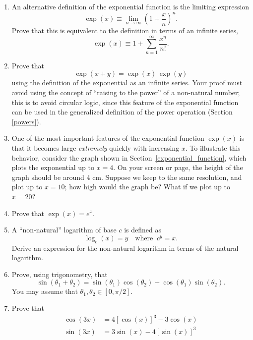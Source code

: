 \documentclass[10pt,a4paper]{article}
\begin{document}
\begin{enumerate}
  \def\labelenumi{\arabic{enumi}.}
\item
  An alternative definition of the exponential function is the limiting
  expression
  \begin{equation}
    \exp(x) \equiv \lim_{n\rightarrow\infty} \left(1+\frac{x}{n}\right)^n.
  \end{equation}
  Prove that this is equivalent to the definition in terms of an
  infinite series,
  \begin{equation}
    \exp(x) \equiv 1 + \sum_{n=1}^\infty\frac{x^n}{n!}.
  \end{equation}

\item
  Prove that
  \begin{equation}
    \exp(x+y) = \exp(x)\,\exp(y)
  \end{equation}
  using the definition of the exponential as an infinite series. Your
  proof must avoid using the concept of ``raising to the power'' of a
  non-natural number; this is to avoid circular logic, since this
  feature of the exponential function can be used in the generalized
  definition of the power operation (Section \ref{powers}).

\item
  One of the most important features of the exponential function
  $\exp(x)$ is that it becomes large \emph{extremely} quickly with
  increasing $x$. To illustrate this behavior, consider the graph
  shown in Section~\ref{exponential_function}, which plots the
  exponential up to $x = 4$.  On your screen or page, the height of
  the graph should be around 4 cm. Suppose we keep to the same
  resolution, and plot up to $x = 10$; how high would the graph be?
  What if we plot up to $x = 20$?

\item
  Prove that $\displaystyle \exp(x) = e^x.$

\item
  A ``non-natural'' logarithm of base $c$ is defined as
  \begin{equation}
    \log_c(x) = y \quad\mathrm{where}\;\; c^y = x.
  \end{equation}
  Derive an expression for the non-natural logarithm in terms of the
  natural logarithm.

\item
  Prove, using trigonometry, that
  \begin{equation}
    \sin(\theta_1 + \theta_2) = \sin(\theta_1) \cos(\theta_2) + \cos(\theta_1)\sin(\theta_2).
  \end{equation}
  You may assume that $\theta_1, \theta_2 \in [0, \pi/2].$

\item
  Prove that
  \begin{align}
    \cos(3x) &= 4[\cos(x)]^3 -3\cos(x) \\
    \sin(3x) &= 3\sin(x)-4[\sin(x)]^3
  \end{align}
\end{enumerate}
\end{document}
